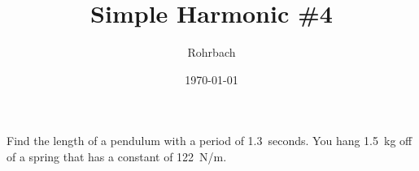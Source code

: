 \documentclass[10pt]{exam}
\title{Simple Harmonic \#4}
\author{Rohrbach}
\date{\today}
\begin{document}
\maketitle

\begin{questions}
  \question  Find the length of a pendulum with a period of 1.3~seconds. \vs 
  \question  You hang 1.5~kg off of a spring that has a constant of 122~N/m.

\end{questions}
\end{document}
